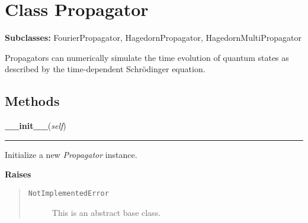 
\section{Class Propagator}

    \label{Propagator:Propagator}
\textbf{Subclasses:}
FourierPropagator,
HagedornPropagator,
HagedornMultiPropagator

Propagators can numerically simulate the time evolution of quantum states
as described by the time-dependent Schrödinger equation.



  \subsection{Methods}

    \label{Propagator:Propagator:__init__}

    \vspace{0.5ex}

\hspace{.8\funcindent}\begin{boxedminipage}{\funcwidth}

    \raggedright \textbf{\_\_init\_\_}(\textit{self})

    \vspace{-1.5ex}

    \rule{\textwidth}{0.5\fboxrule}
\setlength{\parskip}{2ex}
    Initialize a new \textit{Propagator} instance.

\setlength{\parskip}{1ex}
      \textbf{Raises}
    \vspace{-1ex}

      \begin{quote}
        \begin{description}

          \item[\texttt{NotImplementedError}]

          This is an abstract base class.

        \end{description}

      \end{quote}

    \end{boxedminipage}


